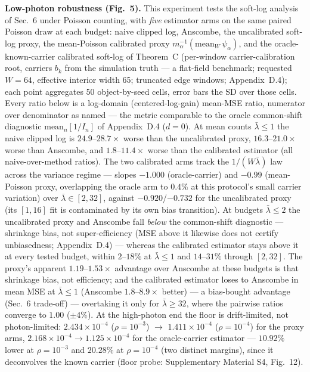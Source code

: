 \noindent\textbf{Low-photon robustness (Fig.~5).} This experiment tests the soft-log analysis of Sec.~6 under Poisson counting, with \emph{five} estimator arms on the same paired Poisson draw at each budget: naive clipped log, Anscombe, the uncalibrated soft-log proxy, the mean-Poisson calibrated proxy $m_\alpha^{-1}(\mathrm{mean}_W\,\psi_\alpha)$, and the oracle-known-carrier calibrated soft-log of Theorem~C (per-window carrier-calibration root, carriers $b_k$ from the simulation truth --- a flat-field benchmark; requested $W=64$, effective interior width 65; truncated edge windows; Appendix~D.4); each point aggregates 50 object-by-seed cells, error bars the SD over those cells. Every ratio below is a log-domain (centered-log-gain) mean-MSE ratio, numerator over denominator as named --- the metric comparable to the oracle common-shift diagnostic $\mathrm{mean}_n[1/I_n]$ of Appendix~D.4 ($d=0$). At mean counts $\bar\lambda\le1$ the naive clipped log is $24.9$--$28.7\times$ worse than the uncalibrated proxy, $16.3$--$21.0\times$ worse than Anscombe, and $1.8$--$11.4\times$ worse than the calibrated estimator (all naive-over-method ratios). The two calibrated arms track the $1/(W\bar\lambda)$ law across the variance regime --- slopes $-1.000$ (oracle-carrier) and $-0.99$ (mean-Poisson proxy, overlapping the oracle arm to $0.4\%$ at this protocol's small carrier variation) over $\bar\lambda\in[2,32]$, against $-0.920$/$-0.732$ for the uncalibrated proxy (its $[1,16]$ fit is contaminated by its own bias transition). At budgets $\bar\lambda\le2$ the uncalibrated proxy and Anscombe fall \emph{below} the common-shift diagnostic --- shrinkage bias, not super-efficiency (MSE above it likewise does not certify unbiasedness; Appendix~D.4) --- whereas the calibrated estimator stays above it at every tested budget, within $2$--$18\%$ at $\bar\lambda\le1$ and $14$--$31\%$ through $[2,32]$. The proxy's apparent $1.19$--$1.53\times$ advantage over Anscombe at these budgets is that shrinkage bias, not efficiency; and the calibrated estimator loses to Anscombe in mean MSE at $\bar\lambda\le1$ (Anscombe $1.8$--$8.9\times$ better) --- a bias-bought advantage (Sec.~6 trade-off) --- overtaking it only for $\bar\lambda\ge32$, where the pairwise ratios converge to $1.00$ ($\pm4\%$). At the high-photon end the floor is drift-limited, not photon-limited: $2.434\times10^{-4}$ ($\rho=10^{-3}$) $\to$ $1.411\times10^{-4}$ ($\rho=10^{-4}$) for the proxy arms, $2.168\times10^{-4}\to1.125\times10^{-4}$ for the oracle-carrier estimator --- $10.92\%$ lower at $\rho=10^{-3}$ and $20.28\%$ at $\rho=10^{-4}$ (two distinct margins), since it deconvolves the known carrier (floor probe: Supplementary Material S4, Fig.~12).

